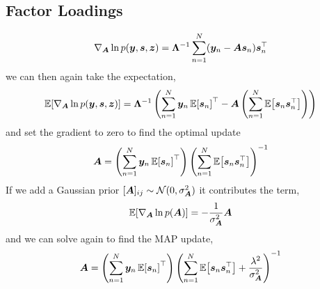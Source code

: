 \documentclass{article}
\newcommand{\mix}{\bm{A}}
\newcommand{\source}{s}
\newcommand{\sourcevec}{\bm{\source}}
\newcommand{\obs}{y}
\newcommand{\obsvec}{\bm{\obs}}
\newcommand{\scale}{\sigma}
\newcommand{\scalesq}{\scale^2}
\newcommand{\assign}{z}
\newcommand{\assignvec}{\bm{\assign}}
\newcommand{\noisecov}{\bm{\Lambda}}
\newcommand{\noisescalesq}{\lambda^2}
\begin{document}
\subsection{Factor Loadings}
\begin{equation}
\nabla_{\mix}\ln p(\obsvec,\sourcevec,\assignvec)=\noisecov^{-1}\sum_{n=1}^{N}(\obsvec_n-\mix\sourcevec_n)\sourcevec_n\T
\end{equation}
we can then again take the expectation, 
\begin{equation}
\E{\nabla_{\mix}\ln p(\obsvec,\sourcevec,\assignvec)}=\noisecov^{-1}\left(\sum_{n=1}^{N}\obsvec_n\E{\sourcevec_n}\T-\mix\left(\sum_{n=1}^{N}\E{\sourcevec_n\sourcevec_n\T}\right)\right)
\end{equation}
and set the gradient to zero to find the optimal update
\begin{equation*}
\mix = \left(\sum_{n=1}^{N}\obsvec_n\E{\sourcevec_n}\T\right)\left(\sum_{n=1}^{N}\E{\sourcevec_n\sourcevec_n\T}\right)^{-1}
\end{equation*}
If we add a Gaussian prior $[\mix]_{ij}\sim \gaussrnd(0,\scalesq_{\mix})$ it contributes the term,
\begin{equation*}
\E{\nabla_{\mix}\ln p(\mix)}=-\frac{1}{\scalesq_{\mix}} \mix
\end{equation*}
and we can solve again to find the MAP update,
\begin{equation*}
\mix = \left(\sum_{n=1}^{N}\obsvec_n\E{\sourcevec_n}\T\right)\left(\sum_{n=1}^{N}\E{\sourcevec_n\sourcevec_n\T}+\frac{\noisescalesq}{\scalesq_{\mix}}\right)^{-1}
\end{equation*}
\end{document}
